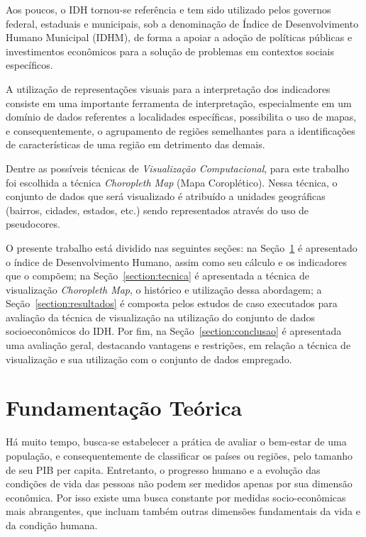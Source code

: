\documentclass[conference]{IEEEtran}
\begin{document}
Aos poucos, o IDH tornou-se referência e tem sido utilizado pelos governos federal, estaduais e municipais, sob a denominação de Índice de Desenvolvimento Humano Municipal (IDHM), de forma a apoiar a adoção de políticas públicas e investimentos econômicos para a solução de problemas em contextos sociais específicos.

A utilização de representações visuais para a interpretação dos indicadores consiste em uma importante ferramenta de interpretação, especialmente em um domínio de dados referentes a localidades específicas, possibilita o uso de mapas, e consequentemente, o agrupamento de regiões semelhantes para a identificações de características de uma região em detrimento das demais. 

Dentre as possíveis técnicas de \textit{Visualização Computacional}, para este trabalho foi escolhida a técnica \textit{Choropleth Map} (Mapa Coroplético). Nessa técnica, o conjunto de dados que será visualizado é atribuído a unidades geográficas (bairros, cidades, estados, etc.) sendo representados através do uso de pseudocores.

O presente trabalho está dividido nas seguintes seções: na Seção~\ref{section:fundamento} é apresentado o índice de Desenvolvimento Humano, assim como seu cálculo e os indicadores que o compõem; na Seção~\ref{section:tecnica} é apresentada a técnica de visualização \textit{Choropleth Map}, o histórico e utilização dessa abordagem; a Seção~\ref{section:resultados} é composta pelos estudos de caso executados para avaliação da técnica de visualização na utilização do conjunto de dados socioeconômicos do IDH. Por fim, na Seção~\ref{section:conclusao} é apresentada uma avaliação geral, destacando vantagens e restrições, em relação a técnica de visualização e sua utilização com o conjunto de dados empregado.

\section{Fundamentação Teórica}
\label{section:fundamento}

Há muito tempo, busca-se estabelecer a prática de avaliar o bem-estar de uma população, e consequentemente de classificar os países ou regiões, pelo tamanho de seu PIB per capita. Entretanto, o progresso humano e a evolução das condições de vida das pessoas não podem ser medidos apenas por sua dimensão econômica. Por isso existe uma busca constante por medidas socio-econômicas mais abrangentes, que incluam também outras dimensões fundamentais da vida e da condição humana. 
\end{document}
